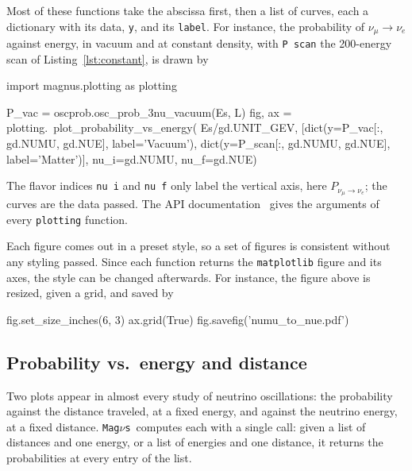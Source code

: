 \documentclass[final,5p,times,twocolumn,sort,compress]{elsarticle}
\makeatletter
\DeclareRobustCommand{\_}{%
  \ifmmode\nfss@text{\textunderscore}\else\textunderscore\allowbreak\fi}
\newcommand{\magnus}{{\tt Mag}\ensuremath{\nu}{\tt s}}
\makeatother
\begin{document}
Most of these functions take the abscissa first, then a list of curves, each a dictionary with its data, {\tt y}, and its {\tt label}. For instance, the probability of $\nu_\mu \to \nu_e$ against energy, in vacuum and at constant density, with {\tt P\_scan} the 200-energy scan of Listing~\ref{lst:constant}, is drawn by
\begin{pysnip}
import magnus.plotting as plotting

P_vac = oscprob.osc_prob_3nu_vacuum(Es, L)
fig, ax = plotting.\
    plot_probability_vs_energy(
    Es/gd.UNIT_GEV,
    [dict(y=P_vac[:, gd.NUMU, gd.NUE],
          label='Vacuum'),
     dict(y=P_scan[:, gd.NUMU, gd.NUE],
          label='Matter')],
    nu_i=gd.NUMU, nu_f=gd.NUE)
\end{pysnip}
The flavor indices {\tt nu\_i} and {\tt nu\_f} only label the vertical axis, here $P_{\nu_\mu \to \nu_e}$; the curves are the data passed. The API documentation~\cite{MagnusDocs} gives the arguments of every {\tt plotting} function.

Each figure comes out in a preset style, so a set of figures is consistent without any styling passed. Since each function returns the {\tt matplotlib} figure and its axes, the style can be changed afterwards. For instance, the figure above is resized, given a grid, and saved by
\begin{pysnip}
fig.set_size_inches(6, 3)
ax.grid(True)
fig.savefig('numu_to_nue.pdf')
\end{pysnip}


\subsection{Probability vs.~energy and distance}
\label{sec:prob_vs}

Two plots appear in almost every study of neutrino oscillations: the probability against the distance traveled, at a fixed energy, and against the neutrino energy, at a fixed distance. \magnus\ computes each with a single call: given a list of distances and one energy, or a list of energies and one distance, it returns the probabilities at every entry of the list.
\end{document}
